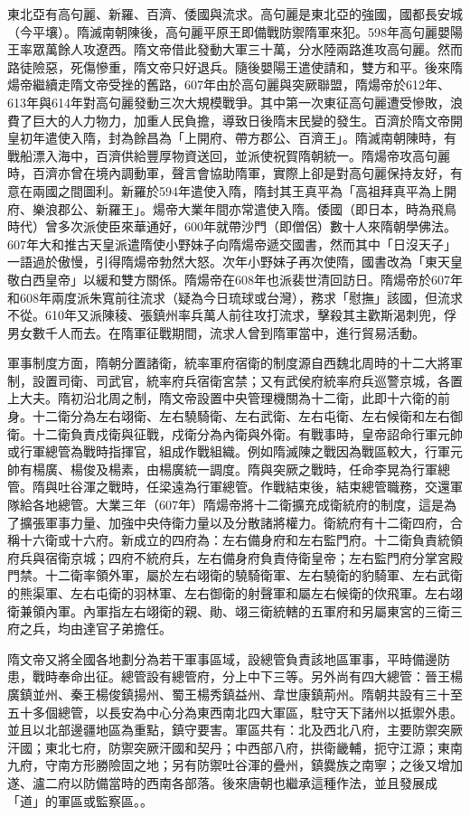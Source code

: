 東北亞有高句麗、新羅、百濟、倭國與流求。高句麗是東北亞的強國，國都長安城（今平壤）。隋滅南朝陳後，高句麗平原王即備戰防禦隋軍來犯。598年高句麗嬰陽王率眾萬餘人攻遼西。隋文帝借此發動大軍三十萬，分水陸兩路進攻高句麗。然而路徒險惡，死傷慘重，隋文帝只好退兵。隨後嬰陽王遣使請和，雙方和平。後來隋煬帝繼續走隋文帝受挫的舊路，607年由於高句麗與突厥聯盟，隋煬帝於612年、613年與614年對高句麗發動三次大規模戰爭。其中第一次東征高句麗遭受慘敗，浪費了巨大的人力物力，加重人民負擔，導致日後隋末民變的發生。百濟於隋文帝開皇初年遣使入隋，封為餘昌為「上開府、帶方郡公、百濟王」。隋滅南朝陳時，有戰船漂入海中，百濟供給豐厚物資送回，並派使祝賀隋朝統一。隋煬帝攻高句麗時，百濟亦曾在境內調動軍，聲言會協助隋軍，實際上卻是對高句麗保持友好，有意在兩國之間圖利。新羅於594年遣使入隋，隋封其王真平為「高祖拜真平為上開府、樂浪郡公、新羅王」。煬帝大業年間亦常遣使入隋。倭國（即日本，時為飛鳥時代）曾多次派使臣來華通好，600年就帶沙門（即僧侶）數十人來隋朝學佛法。607年大和推古天皇派遣隋使小野妹子向隋煬帝遞交國書，然而其中「日沒天子」一語過於傲慢，引得隋煬帝勃然大怒。次年小野妹子再次使隋，國書改為「東天皇敬白西皇帝」以緩和雙方關係。隋煬帝在608年也派裴世清回訪日。隋煬帝於607年和608年兩度派朱寬前往流求（疑為今日琉球或台灣），務求「慰撫」該國，但流求不從。610年又派陳稜、張鎮州率兵萬人前往攻打流求，擊殺其主歡斯渴刺兜，俘男女數千人而去。在隋軍征戰期間，流求人曾到隋軍當中，進行貿易活動。

軍事制度方面，隋朝分置諸衛，統率軍府宿衛的制度源自西魏北周時的十二大將軍制，設置司衛、司武官，統率府兵宿衛宮禁；又有武侯府統率府兵巡警京城，各置上大夫。隋初沿北周之制，隋文帝設置中央管理機關為十二衛，此即十六衛的前身。十二衛分為左右翊衛、左右驍騎衛、左右武衛、左右屯衛、左右候衛和左右御衛。十二衛負責戍衛與征戰，戍衛分為內衛與外衛。有戰事時，皇帝詔命行軍元帥或行軍總管為戰時指揮官，組成作戰組織。例如隋滅陳之戰因為戰區較大，行軍元帥有楊廣、楊俊及楊素，由楊廣統一調度。隋與突厥之戰時，任命李晃為行軍總管。隋與吐谷渾之戰時，任梁遠為行軍總管。作戰結束後，結束總管職務，交還軍隊給各地總管。大業三年（607年）隋煬帝將十二衛擴充成衛統府的制度，這是為了擴張軍事力量、加強中央侍衛力量以及分散諸將權力。衛統府有十二衛四府，合稱十六衛或十六府。新成立的四府為：左右備身府和左右監門府。十二衛負責統領府兵與宿衛京城；四府不統府兵，左右備身府負責侍衛皇帝；左右監門府分掌宮殿門禁。十二衛率領外軍，屬於左右翊衛的驍騎衛軍、左右驍衛的豹騎軍、左右武衛的熊渠軍、左右屯衛的羽林軍、左右御衛的射聲軍和屬左右候衛的佽飛軍。左右翊衛兼領內軍。內軍指左右翊衛的親、勛、翊三衛統轄的五軍府和另屬東宮的三衛三府之兵，均由達官子弟擔任。

隋文帝又將全國各地劃分為若干軍事區域，設總管負責該地區軍事，平時備邊防患，戰時奉命出征。總管設有總管府，分上中下三等。另外尚有四大總管：晉王楊廣鎮並州、秦王楊俊鎮揚州、蜀王楊秀鎮益州、韋世康鎮荊州。隋朝共設有三十至五十多個總管，以長安為中心分為東西南北四大軍區，駐守天下諸州以抵禦外患。並且以北部邊疆地區為重點，鎮守要害。軍區共有：北及西北八府，主要防禦突厥汗國；東北七府，防禦突厥汗國和契丹；中西部八府，拱衛畿輔，扼守江源；東南九府，守南方形勝險固之地；另有防禦吐谷渾的疊州，鎮爨族之南寧；之後又增加遂、瀘二府以防備當時的西南各部落。後來唐朝也繼承這種作法，並且發展成「道」的軍區或監察區。。

